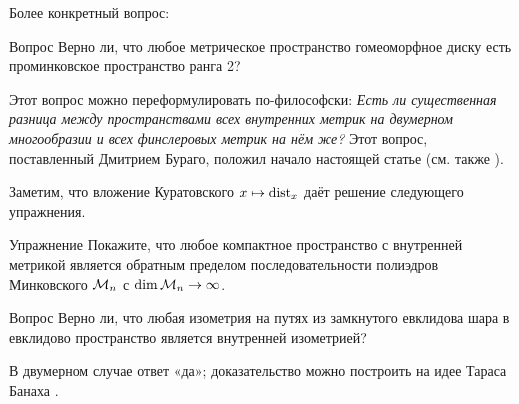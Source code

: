 \documentclass[oneside,a4paper]{article}
\begin{document}
Более конкретный вопрос:

\begin{thm}{Вопрос}\label{ru-mink-disk}
Верно ли, что любое метрическое пространство гомеоморфное диску есть проминковское пространство ранга 2?
\end{thm}

Этот вопрос можно переформулировать по-философски: 
\textit{Есть ли существенная разница между пространствами всех внутренних метрик на двумерном многообразии и всех финслеровых метрик на нём же?}
Этот вопрос, поставленный Дмитрием Бураго, положил начало настоящей статье (см. также \cite[теорема 1]{BIS}).

Заметим, что вложение Куратовского $x\mapsto \mathop{\rm dist}_x$ даёт решение следующего упражнения.

\begin{thm}{Упражнение}
Покажите, что любое компактное пространство с внутренней метрикой является обратным пределом последовательности полиэдров Минковского $\mathcal{M}_n$ с $\mathop{\rm dim}\nolimits \mathcal{M}_n\to\infty$.
\end{thm}

\begin{thm}{Вопрос}
Верно ли, что любая изометрия на путях из замкнутого евклидова шара в евклидово пространство является внутренней изометрией? 
\end{thm}

В двумерном случае ответ «да»;
доказательство можно построить на идее Тараса Банаха \cite{ru-banakh}.
\end{document}
